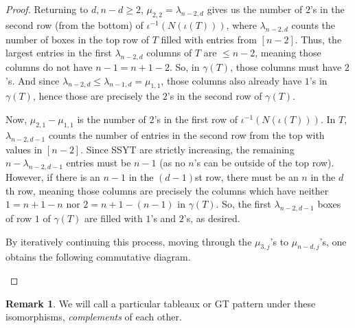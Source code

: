 \documentclass[10pt]{article}
\theoremstyle{plain}
\theoremstyle{definition}
\newtheorem{remark}[thm]{Remark}
\begin{document}
\begin{proof}
Returning to $d, n-d \geq 2$, $\mu_{2,2}= \lambda_{n-2,d}$ gives us the number of $2$'s in the second row (from the bottom) of $\iota^{-1}\left(N\left(\iota(T)\right)\right)$, where $\lambda_{n-2,d}$ counts the number of boxes in the top row of $T$ filled with entries from $[n-2]$.  Thus, the largest entries in the first $\lambda_{n-2,d}$ columns of $T$ are $\leq n-2$, meaning those columns do not have $n-1=n+1-2$.  So, in $\gamma(T)$, those columns must have $2$'s. And since $\lambda_{n-2,d}\leq \lambda_{n-1,d}=\mu_{1,1}$, those columns also already have $1$'s in $\gamma(T)$, hence those are precisely the $2$'s in the second row of $\gamma(T)$.

Now, $\mu_{2,1}-\mu_{1,1}$ is the number of $2$'s in the first row of $\iota^{-1}\left(N\left(\iota(T)\right)\right)$.  In $T$, $\lambda_{n-2,d-1}$ counts the number of entries in the second row from the top with values in $[n-2]$.  Since SSYT are strictly increasing, the remaining $n-\lambda_{n-2,d-1}$ entries must be $n-1$ (as no $n$'s can be outside of the top row).  However, if there is an $n-1$ in the $(d-1)$st row, there must be an $n$ in the $d$th row, meaning those columns are precisely the columns which have neither $1=n+1-n$ nor $2=n+1-(n-1)$ in $\gamma(T)$. So, the first $\lambda_{n-2,d-1}$ boxes of row $1$ of $\gamma(T)$ are filled with $1$'s and $2$'s, as desired.

By iteratively continuing this process, moving through the $\mu_{3,j}$'s to $\mu_{n-d,j}$'s, one obtains the following commutative diagram.

\begin{center}
\end{center}
\end{proof} 

\begin{remark}
We will call a particular tableaux or GT pattern under these isomorphisms, \emph{complements} of each other. 
\end{remark}
\end{document}
